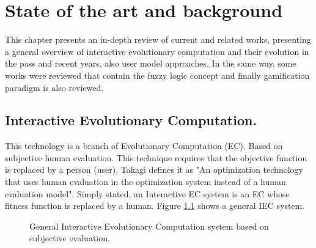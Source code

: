 \chapter{State of the art and background} \label{}
This chapter presents an in-depth review of current and related works,
presenting a general overview of interactive evolutionary computation and their
evolution in the pass and recent years, also user model approaches, In the same
way, some works were reviewed that contain the fuzzy logic concept and finally
gamification paradigm is also reviewed.

\section{Interactive Evolutionary Computation.}

This technology is a branch of Evolutionary Computation (EC).  Based on
subjective human evaluation. This technique requires that the objective function
is replaced by a person (user), Takagi defines it as "An optimization technology
that uses human evaluation in the optimization system instead of a human
evaluation model"\cite{takagi1998application}. Simply stated, an Interactive EC
system is an EC whose fitness function is replaced by a human.   Figure
\ref{fig:IEC} shows a general IEC system.

\begin{figure}
	\captionsetup{justification=centering,margin=2cm}
	\centering
	\setlength\fboxsep{0pt}
	\setlength\fboxrule{0.7pt}
	\caption{ General Interactive Evolutionary Computation system based on subjective evaluation.}
	\label{fig:IEC}
\end{figure}


